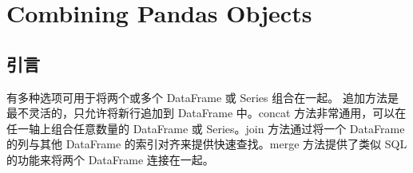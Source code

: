 \chapter{Combining Pandas Objects\label{ch11}}
\section{引言}
有多种选项可用于将两个或多个 DataFrame 或 Series 组合在一起。 追加方法是最不灵活的，只允许将新行追加到 DataFrame 中。concat 方法非常通用，可以在任一轴上组合任意数量的 DataFrame 或 Series。join 方法通过将一个 DataFrame 的列与其他 DataFrame 的索引对齐来提供快速查找。merge 方法提供了类似 SQL 的功能来将两个 DataFrame 连接在一起。